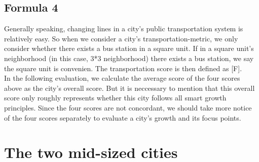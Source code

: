 \subsection{Formula 4}
Generally speaking, changing lines in a city's public transportation system is relatively easy.
So when we consider a city's transportation-metric, we only consider whether there exists a bus station in a square unit.
If in a square unit's neighborhood (in this case, 3*3 neighborhood) there exists a bus station, we say the square unit is convenien.
The transportation score is then defined as [F].
\\
In the following evaluation, we calculate the average score of the four scores above as the city's overall score.
But it is neccessary to mention that this overall score only roughly represents whether this city follows all smart growth principles.
Since the four scores are not concordant, we should take more notice of the four scores separately to evaluate a city's growth and its focus points.
\\


\section{The two mid-sized cities}
